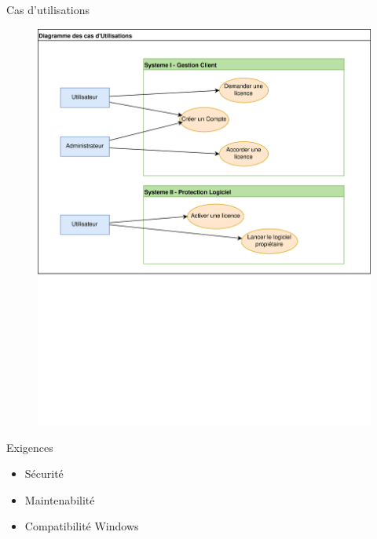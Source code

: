 \documentclass{cubeamer}
\begin{document}
\begin{frame}{Cas d'utilisations}
    \begin{figure}
        \centering
        \includegraphics[scale=0.5]{img/Util.png}
    \end{figure}
\end{frame}

\begin{frame}{Exigences}
    \begin{itemize}
        \item Sécurité
        \pause
        \item Maintenabilité
        \pause
        \item Compatibilité Windows
    \end{itemize}
\end{frame}
\end{document}
